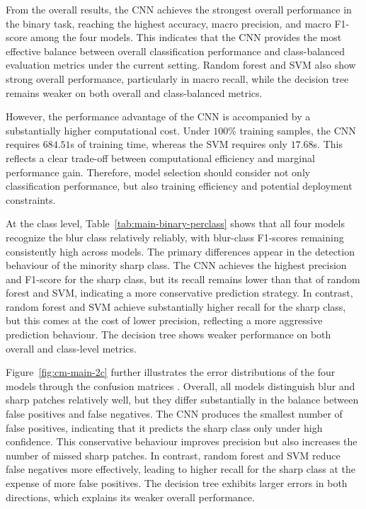 \par From the overall results, the CNN achieves the strongest overall
performance in the binary task, reaching the highest accuracy, macro
precision, and macro F1-score among the four models. This indicates that the
CNN provides the most effective balance between overall classification
performance and class-balanced evaluation metrics under the current setting.
Random forest and SVM also show strong overall performance, particularly in
macro recall, while the decision tree remains weaker on both overall and
class-balanced metrics.

\par However, the performance advantage of the CNN is accompanied by a
substantially higher computational cost. Under $100\%$ training samples, the
CNN requires $684.51$s of training time, whereas the SVM requires only
$17.68$s. This reflects a clear trade-off between computational efficiency and
marginal performance gain. Therefore, model selection should consider not only
classification performance, but also training efficiency and potential
deployment constraints.

\par At the class level, Table~\ref{tab:main-binary-perclass} shows that all
four models recognize the blur class relatively reliably, with blur-class
F1-scores remaining consistently high across models. The primary differences
appear in the detection behaviour of the minority sharp class. The CNN achieves
the highest precision and F1-score for the sharp class, but its recall remains
lower than that of random forest and SVM, indicating a more conservative
prediction strategy. In contrast, random forest and SVM achieve substantially
higher recall for the sharp class, but this comes at the cost of lower
precision, reflecting a more aggressive prediction behaviour. The decision tree
shows weaker performance on both overall and class-level metrics.

\par Figure~\ref{fig:cm-main-2c} further illustrates the error distributions of
the four models through the confusion matrices
\cite{schutze2008introduction}. Overall, all models distinguish blur and sharp
patches relatively well, but they differ substantially in the balance between
false positives and false negatives. The CNN produces the smallest number of
false positives, indicating that it predicts the sharp class only under high
confidence. This conservative behaviour improves precision but also increases
the number of missed sharp patches. In contrast, random forest and SVM reduce
false negatives more effectively, leading to higher recall for the sharp class
at the expense of more false positives. The decision tree exhibits larger
errors in both directions, which explains its weaker overall performance.

